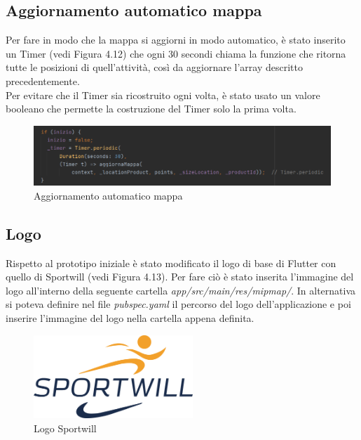 \newpage

\subsection{Aggiornamento automatico mappa}
Per fare in modo che la mappa si aggiorni in modo automatico, è stato inserito un Timer (vedi Figura 4.12) che ogni 30 secondi chiama la funzione che ritorna tutte le posizioni di quell'attività, così da aggiornare l'array descritto precedentemente.\\
Per evitare che il Timer sia ricostruito ogni volta, è stato usato un valore booleano che permette la costruzione del Timer solo la prima volta.\\

\begin{figure}[htbp]	
	\centering
	\includegraphics[width=14cm]{immagini/automatico.png}
	\caption{Aggiornamento automatico mappa}
	\label{fig:Aggiornamento automatico mappa}
\end{figure}

\subsection{Logo}
Rispetto al prototipo iniziale è stato modificato il logo di base di Flutter con quello di Sportwill (vedi Figura 4.13).
Per  fare ciò è stato inserita l'immagine del logo all'interno della seguente cartella \textit{app/src/main/res/mipmap/}.
In alternativa si poteva definire nel file \textit{pubspec.yaml} il percorso del logo dell'applicazione e poi inserire l'immagine del logo nella cartella appena definita.\\

\begin{figure}[htbp]	
	\centering
	\includegraphics[width=6cm]{immagini/logosportwill.png}
	\caption{Logo Sportwill}
	\label{fig:Logo Sportwill}
\end{figure}

